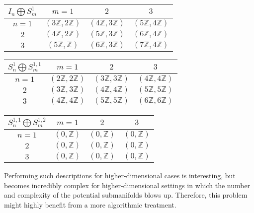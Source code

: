 \begin{minipage}{0.5\textwidth}
\centering
\begin{tabular}{|c|c|c|c|}
\hline
$I_n\bigoplus S^1_m$ & $m=1$ & $2$ & $3$ \\
\hline
$n=1$ & $(3\mathbb{Z},2\mathbb{Z})$ & $(4\mathbb{Z},3\mathbb{Z})$ & $(5\mathbb{Z},4\mathbb{Z})$ \\
\hline
$2$ & $(4\mathbb{Z},2\mathbb{Z})$ & $(5\mathbb{Z},3\mathbb{Z})$ & $(6\mathbb{Z},4\mathbb{Z})$ \\
\hline
$3$ & $(5\mathbb{Z},\mathbb{Z})$ & $(6\mathbb{Z},3\mathbb{Z})$ & $(7\mathbb{Z},4\mathbb{Z})$ \\
\hline
\end{tabular}
\end{minipage}
\begin{minipage}{0.5\textwidth}
\centering
\begin{tabular}{|c|c|c|c|}
\hline
$S^1_n\bigoplus S^{1,1}_m$ & $m=1$ & $2$ & $3$ \\
\hline
$n=1$ & $(2\mathbb{Z},2\mathbb{Z})$ & $(3\mathbb{Z},3\mathbb{Z})$ & $(4\mathbb{Z},4\mathbb{Z})$ \\
\hline
$2$ & $(3\mathbb{Z},3\mathbb{Z})$ & $(4\mathbb{Z},4\mathbb{Z})$ & $(5\mathbb{Z},5\mathbb{Z})$ \\
\hline
$3$ & $(4\mathbb{Z},4\mathbb{Z})$ & $(5\mathbb{Z},5\mathbb{Z})$ & $(6\mathbb{Z},6\mathbb{Z})$ \\
\hline
\end{tabular}
\end{minipage}

\vspace{1cm}

\begin{minipage}{\textwidth}
\centering
\begin{tabular}{|c|c|c|c|}
\hline
$S^{1,1}_n \bigoplus S^{1,2}_m$ & $m=1$ & $2$ & $3$ \\
\hline
$n=1$ & $(0,\mathbb{Z})$ & $(0,\mathbb{Z})$ & $(0,\mathbb{Z})$ \\
\hline
$2$ & $(0,\mathbb{Z})$ & $(0,\mathbb{Z})$ & $(0,\mathbb{Z})$ \\
\hline
$3$ & $(0,\mathbb{Z})$ & $(0,\mathbb{Z})$ & $(0,\mathbb{Z})$ \\
\hline
\end{tabular}
\end{minipage}

\vspace{1cm} 

Performing such descriptions for higher-dimensional cases is interesting, but becomes incredibly complex for higher-dimensional settings in which the number and complexity of the potential submanifolds blows up. Therefore, this problem might highly benefit from a more algorithmic treatment.

